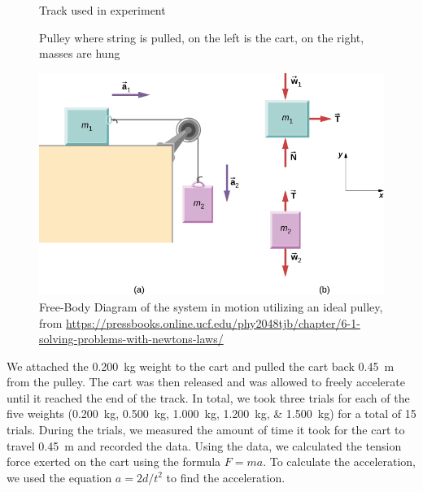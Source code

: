 ﻿\documentclass[reprint,amsmath,amssymb,aps,twoside]{revtex4-2}
\begin{document}
\begin{figure}
\begin{center}

\end{center}
\caption{Track used in experiment}
\label{fig:1}
\end{figure}

\begin{figure}
\begin{center}

\end{center}
\caption{Pulley where string is pulled, on the left is the cart, on the right, masses are hung}
\label{fig:2}
\end{figure}
  
\begin{figure}
\begin{center}
\includegraphics[width=\columnwidth]{CNX_UPhysics_06_01_Table.jpg}
\end{center}
\caption{Free-Body Diagram of the system in motion utilizing an ideal pulley, from \url{https://pressbooks.online.ucf.edu/phy2048tjb/chapter/6-1-solving-problems-with-newtons-laws/}}
\label{fig:3}
\end{figure}

We attached the \qty{0.200}{\kilo\gram} weight to the cart and pulled the cart back \qty{0.45}{\meter} from the pulley. The cart was then released and was allowed to freely accelerate until it reached the end of the track. In total, we took three trials for each of the five weights (\qtylist{0.200;0.500;1.000;1.200;1.500}{\kilo\gram}) for a total of 15 trials. During the trials, we measured the amount of time it took for the cart to travel \qty{0.45}{\meter} and recorded the data. Using the data, we calculated the tension force exerted on the cart using the formula $F=ma$. To calculate the acceleration, we used the equation $a=2d/t^2$ to find the acceleration.
\end{document}

